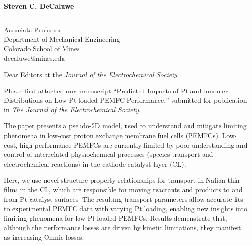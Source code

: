 \documentclass{letter} %
\begin{document}
\longindentation=0pt                       %
\let\raggedleft\raggedright                %
 
 
\begin{letter}{ }

\vspace{-20mm}
\begin{flushleft}
{\large\bf Steven C. DeCaluwe}
\end{flushleft}
\medskip\hrule height 1pt
\begin{flushright}
\hfill Associate Professor\\
\hfill Department of Mechanical Engineering \\
\hfill Colorado School of Mines \\
\hfill decaluwe@mines.edu\\
\end{flushright} 

\opening{Dear Editors at the {\it Journal of the Electrochemical Society},} 

\noindent Please find attached our manuscript ``Predicted Impacts of Pt and Ionomer Distributions on Low Pt-loaded PEMFC Performance,'' submitted for publication in \emph{The Journal of the Electrochemical Society}. 

The paper presents a pseudo-2D model, used to understand and mitigate limiting phenomena in low-cost proton exchange membrane fuel cells (PEMFCs). Low-cost, high-performance PEMFCs are currently limited by poor understanding and control of interrelated physiochemical processes (species transport and electrochemical reactions) in the cathode catalyst layer (CL).  

Here, we use novel structure-property relationships for transport in Nafion thin films in the CL, which are responsible for moving reactants and products to and from Pt catalyst surfaces. The resulting transport parameters allow accurate fits to experimental PEMFC data with varying Pt loading, enabling new insights into limiting phenomena for low-Pt-loaded PEMFCs. Results demonstrate that, although the performance losses are driven by kinetic limitations, they manifest as increasing Ohmic losses. %


\end{letter}
\end{document}
